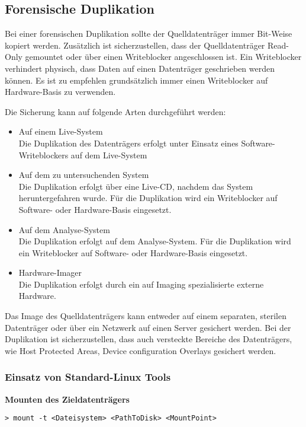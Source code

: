 \subsection{Forensische Duplikation}
Bei einer forensischen Duplikation sollte der Quelldatenträger immer Bit-Weise kopiert werden. Zusätzlich ist sicherzustellen, dass der Quelldatenträger Read-Only gemountet oder über einen Writeblocker angeschlossen ist. Ein Writeblocker verhindert physisch, dass Daten auf einen Datenträger geschrieben werden können. Es ist zu empfehlen grundsätzlich immer einen Writeblocker auf Hardware-Basis zu verwenden.

Die Sicherung kann auf folgende Arten durchgeführt werden:
\begin{itemize}
\item Auf einem Live-System\\
Die Duplikation des Datenträgers erfolgt unter Einsatz eines Software-Writeblockers auf dem Live-System
\item Auf dem zu untersuchenden System\\
Die Duplikation erfolgt über eine Live-CD, nachdem das System heruntergefahren wurde. Für die Duplikation wird ein Writeblocker auf Software- oder Hardware-Basis eingesetzt.
\item Auf dem Analyse-System\\
Die Duplikation erfolgt auf dem Analyse-System. Für die Duplikation wird ein Writeblocker auf Software- oder Hardware-Basis eingesetzt.
\item Hardware-Imager\\
Die Duplikation erfolgt durch ein auf Imaging spezialisierte externe Hardware.
\end{itemize}

Das Image des Quelldatenträgers kann entweder auf einem separaten, sterilen Datenträger oder über ein Netzwerk auf einen Server gesichert werden. Bei der Duplikation ist sicherzustellen, dass auch versteckte Bereiche des Datenträgers, wie Host Protected Areas, Device configuration Overlays gesichert werden.

\subsubsection{Einsatz von Standard-Linux Tools}

\textbf{Mounten des Zieldatenträgers}
\begin{lstlisting}
> mount -t <Dateisystem> <PathToDisk> <MountPoint>
\end{lstlisting}

